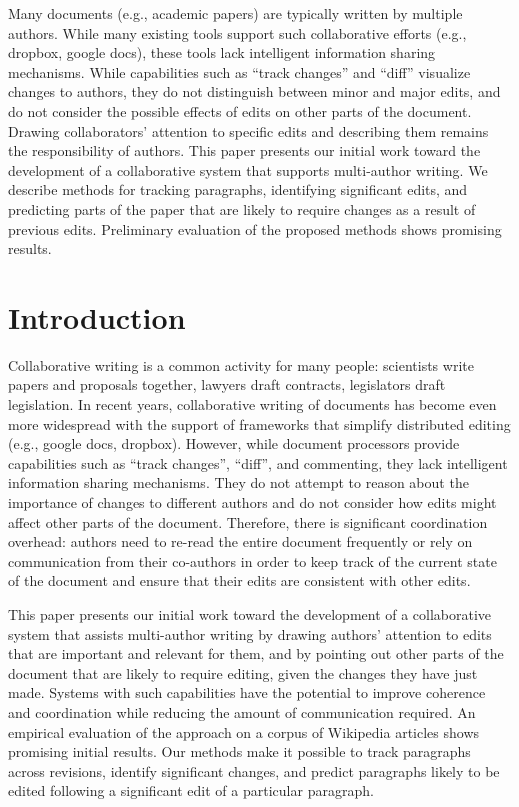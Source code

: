 Many documents (e.g., academic papers) are typically written by multiple
authors. While many existing tools support such collaborative efforts
(e.g., dropbox, google docs), these tools lack intelligent information
sharing mechanisms. While capabilities such as ``track changes'' and
``diff'' visualize changes to authors, they do not distinguish between
minor and major edits, and do not consider the possible effects of edits
on other parts of the document. Drawing collaborators' attention to
specific edits and describing them remains the responsibility of
authors. This paper presents our initial work toward the development of
a collaborative system that supports multi-author writing. We describe
methods for tracking paragraphs, identifying significant edits, and
predicting parts of the paper that are likely to require changes as a
result of previous edits. Preliminary evaluation of the proposed methods
shows promising results.

\section{Introduction}\label{introduction}

Collaborative writing is a common activity for many people: scientists
write papers and proposals together, lawyers draft contracts,
legislators draft legislation. In recent years, collaborative writing of
documents has become even more widespread with the support of frameworks
that simplify distributed editing (e.g., google docs, dropbox). However,
while document processors provide capabilities such as ``track
changes'', ``diff'', and commenting, they lack intelligent information
sharing mechanisms. They do not attempt to reason about the importance
of changes to different authors and do not consider how edits might
affect other parts of the document. Therefore, there is significant
coordination overhead: authors need to re-read the entire document
frequently or rely on communication from their co-authors in order to
keep track of the current state of the document and ensure that their
edits are consistent with other edits.

This paper presents our initial work toward the development of a
collaborative system that assists multi-author writing by drawing
authors' attention to edits that are important and relevant for them,
and by pointing out other parts of the document that are likely to
require editing, given the changes they have just made. Systems with
such capabilities have the potential to improve coherence and
coordination while reducing the amount of communication required. An
empirical evaluation of the approach on a corpus of Wikipedia articles
shows promising initial results. Our methods make it possible to track
paragraphs across revisions, identify significant changes, and predict
paragraphs likely to be edited following a significant edit of a
particular paragraph.

